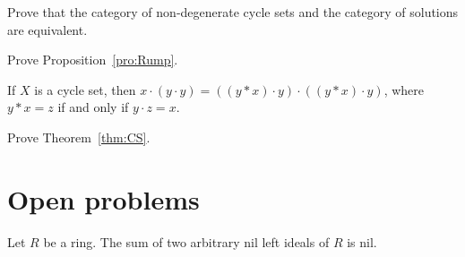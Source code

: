 
\begin{prob}
\label{prob:cycle_sets}
Prove that the category of non-degenerate 
cycle sets and the category of solutions are equivalent. 
\end{prob}

\begin{prob}
\label{prob:Rump}
Prove Proposition~\ref{pro:Rump}. 
\end{prob}

\begin{prob}
If $X$ is a cycle set, then $x\cdot (y\cdot y)=((y*x)\cdot y)\cdot ((y*x)\cdot y)$, where
$y*x=z$ if and only if $y\cdot z=x$. 
\end{prob}

\begin{prob}
\label{prob:CS}
Prove Theorem~\ref{thm:CS}. 
\end{prob}

\section*{Open problems}

\begin{conjecture}
\label{conj:Koethe}
Let $R$ be a ring. 
The sum of two arbitrary nil left ideals of $R$ is nil.  
\end{conjecture}

